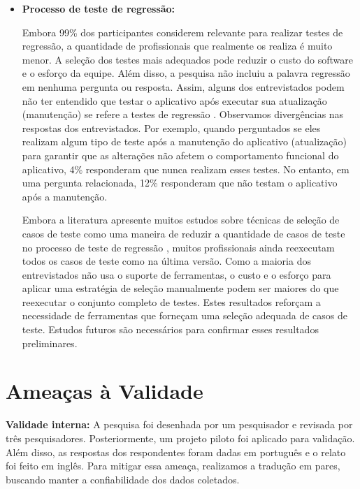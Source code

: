 \begin{itemize}
\item \textbf{Processo de teste de regressão:} 

Embora 99\% dos participantes considerem relevante para realizar testes de regressão, a quantidade de profissionais que realmente os realiza é muito menor. A seleção dos testes mais adequados pode reduzir o custo do software e o esforço da equipe. Além disso, a pesquisa não incluiu a palavra regressão em nenhuma pergunta ou resposta. Assim, alguns dos entrevistados podem não ter entendido que testar o aplicativo após executar sua atualização (manutenção) se refere a testes de regressão \cite{LEUNG1989}. Observamos divergências nas respostas dos entrevistados. Por exemplo, quando perguntados se eles realizam algum tipo de teste após a manutenção do aplicativo (atualização) para garantir que as alterações não afetem o comportamento funcional do aplicativo, 4\% responderam que nunca realizam esses testes. No entanto, em uma pergunta relacionada, 12\% responderam que não testam o aplicativo após a manutenção.
 
Embora a literatura apresente muitos estudos sobre técnicas de seleção de casos de teste como uma maneira de reduzir a quantidade de casos de teste no processo de teste de regressão \cite{KAZMI2017,ENGSTROM201014, 536955, WHITE1991,LEUNG1989}, muitos profissionais ainda reexecutam todos os casos de teste como na última versão. Como a maioria dos entrevistados não usa o suporte de ferramentas, o custo e o esforço para aplicar uma estratégia de seleção manualmente podem ser maiores do que reexecutar o conjunto completo de testes. Estes resultados reforçam a necessidade de ferramentas que forneçam uma seleção adequada de casos de teste. Estudos futuros são necessários para confirmar esses resultados preliminares.

\end{itemize}


\section{Ameaças à Validade}\label{threatstovalidity}

\textbf{Validade interna:} A pesquisa foi desenhada por um pesquisador e revisada por três pesquisadores. Posteriormente, um projeto piloto foi aplicado para validação. Além disso, as respostas dos respondentes foram dadas em português e o relato foi feito em inglês. Para mitigar essa ameaça, realizamos a tradução em pares, buscando manter a confiabilidade dos dados coletados.

